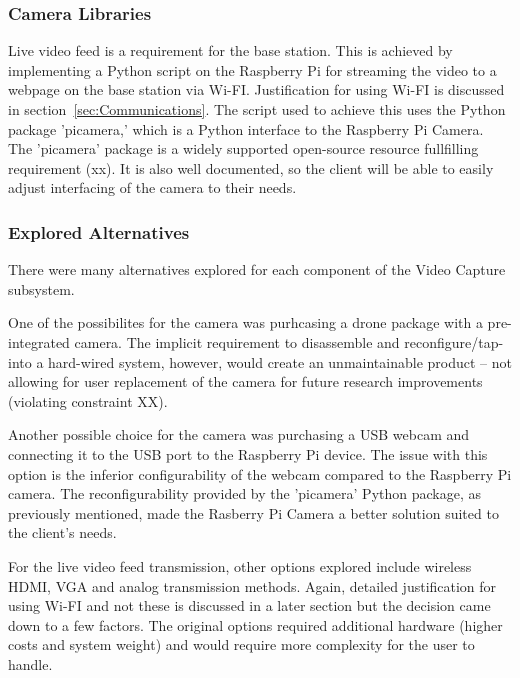 \subsubsection{Camera Libraries}
Live video feed is a requirement for the base station. This is achieved by implementing a Python script on the Raspberry Pi for streaming the video to a webpage on the base station via Wi-FI. Justification for using Wi-FI is discussed in section~\ref{sec:Communications}. The script used to achieve this uses the Python package 'picamera,' which is a Python interface to the Raspberry Pi Camera. The 'picamera' package is a widely supported open-source resource fullfilling requirement (xx). It is also well documented, so the client will be able to easily adjust interfacing of the camera to their needs.

\subsubsection{Explored Alternatives}
There were many alternatives explored for each component of the Video Capture subsystem.

One of the possibilites for the camera was purhcasing a drone package with a pre-integrated camera. The implicit requirement to disassemble and reconfigure/tap-into a hard-wired system, however, would create an unmaintainable product -- not allowing for user replacement of the camera for future research improvements (violating constraint XX). %

Another possible choice for the camera was purchasing a USB webcam and connecting it to the USB port to the Raspberry Pi device. The issue with this option is the inferior configurability of the webcam compared to the Raspberry Pi camera. The reconfigurability provided by the 'picamera' Python package, as previously mentioned, made the Rasberry Pi Camera a better solution suited to the client's needs.

For the live video feed transmission, other options explored include wireless HDMI, VGA and analog transmission methods. Again, detailed justification for using Wi-FI and not these is discussed in a later section but the decision came down to a few factors. The original options required additional hardware (higher costs and system weight) and would require more complexity for the user to handle.
